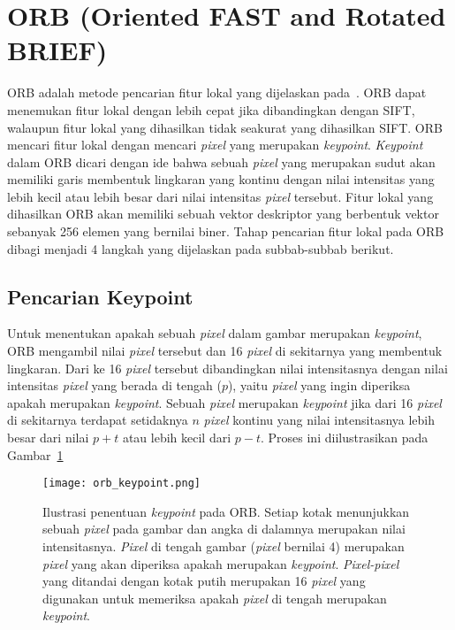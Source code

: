 \section{ORB (Oriented FAST and Rotated BRIEF)}
\label{sec:orb}
ORB adalah metode pencarian fitur lokal yang dijelaskan pada~\cite{rublee2011orb}. ORB dapat menemukan fitur lokal dengan lebih cepat jika dibandingkan dengan SIFT, walaupun fitur lokal yang dihasilkan tidak seakurat yang dihasilkan SIFT. ORB mencari fitur lokal dengan mencari \textit{pixel} yang merupakan \textit{keypoint}. \textit{Keypoint} dalam ORB dicari dengan ide bahwa sebuah \textit{pixel} yang merupakan sudut akan memiliki garis membentuk lingkaran yang kontinu dengan nilai intensitas yang lebih kecil atau lebih besar dari nilai intensitas \textit{pixel} tersebut. Fitur lokal yang dihasilkan ORB akan memiliki sebuah vektor deskriptor yang berbentuk vektor sebanyak 256 elemen yang bernilai biner. Tahap pencarian fitur lokal pada ORB dibagi menjadi 4 langkah yang dijelaskan pada subbab-subbab berikut.

\subsection{Pencarian Keypoint}
\label{subsec:orb_keypoint}
Untuk menentukan apakah sebuah \textit{pixel} dalam gambar merupakan \textit{keypoint}, ORB mengambil nilai \textit{pixel} tersebut dan 16 \textit{pixel} di sekitarnya yang membentuk lingkaran. Dari ke 16 \textit{pixel} tersebut dibandingkan nilai intensitasnya dengan nilai intensitas \textit{pixel} yang berada di tengah ($p$), yaitu \textit{pixel} yang ingin diperiksa apakah merupakan \textit{keypoint}. Sebuah \textit{pixel} merupakan \textit{keypoint} jika dari 16 \textit{pixel} di sekitarnya terdapat setidaknya $n$ \textit{pixel} kontinu yang nilai intensitasnya lebih besar dari nilai $p + t$ atau lebih kecil dari $p - t$. Proses ini diilustrasikan pada Gambar~\ref{fig:orb_keypoint}

\begin{figure}[H]
	\centering
	\texttt{[image: orb\_keypoint.png]}
	\caption{Ilustrasi penentuan \textit{keypoint} pada ORB. Setiap kotak menunjukkan sebuah \textit{pixel} pada gambar dan angka di dalamnya merupakan nilai intensitasnya. \textit{Pixel} di tengah gambar (\textit{pixel} bernilai 4) merupakan \textit{pixel} yang akan diperiksa apakah merupakan \textit{keypoint}. \textit{Pixel-pixel} yang ditandai dengan kotak putih merupakan 16 \textit{pixel} yang digunakan untuk memeriksa apakah \textit{pixel} di tengah merupakan \textit{keypoint}.}
	\label{fig:orb_keypoint}	
\end{figure}

